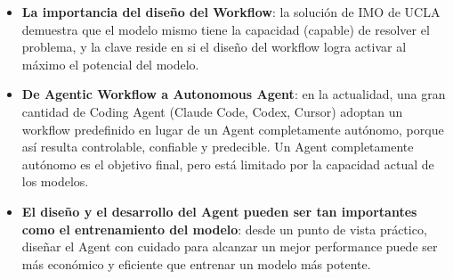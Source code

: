 \documentclass[a4paper]{article}
\begin{document}
\begin{itemize}
    \item \textbf{La importancia del diseño del Workflow}: la solución de IMO de UCLA demuestra que el modelo mismo tiene la capacidad (capable) de resolver el problema, y la clave reside en si el diseño del workflow logra activar al máximo el potencial del modelo.
    \item \textbf{De Agentic Workflow a Autonomous Agent}: en la actualidad, una gran cantidad de Coding Agent (Claude Code, Codex, Cursor) adoptan un workflow predefinido en lugar de un Agent completamente autónomo, porque así resulta controlable, confiable y predecible. Un Agent completamente autónomo es el objetivo final, pero está limitado por la capacidad actual de los modelos.
    \item \textbf{El diseño y el desarrollo del Agent pueden ser tan importantes como el entrenamiento del modelo}: desde un punto de vista práctico, diseñar el Agent con cuidado para alcanzar un mejor performance puede ser más económico y eficiente que entrenar un modelo más potente.
\end{itemize}

\end{document}
